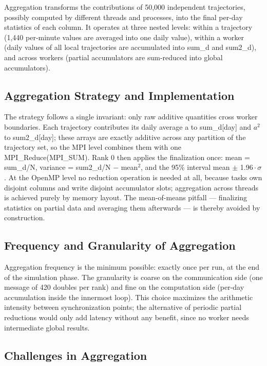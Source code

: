 \documentclass[12pt,a4paper]{article}
\begin{document}
Aggregation transforms the contributions of 50,000 independent
trajectories, possibly computed by different threads and processes, into
the final per-day statistics of each column. It operates at three nested
levels: within a trajectory (1,440 per-minute values are averaged into
one daily value), within a worker (daily values of all local
trajectories are accumulated into sum\_d and sum2\_d), and across
workers (partial accumulators are sum-reduced into global accumulators).

\subsection{Aggregation Strategy and Implementation}

The strategy follows a single invariant: only raw additive quantities
cross worker boundaries. Each trajectory contributes its daily average a
to sum\_d[day] and $a^2$ to sum2\_d[day]; these arrays are exactly
additive across any partition of the trajectory set, so the MPI level
combines them with one MPI\_Reduce(MPI\_SUM). Rank 0 then applies the
finalization once: mean = sum\_d/N, variance = sum2\_d/N $-$ mean$^2$, and the
95\% interval mean $\pm$ 1.96\,$\cdot$\,$\sigma$. At the OpenMP level no reduction operation
is needed at all, because tasks own disjoint columns and write disjoint
accumulator slots; aggregation across threads is achieved purely by
memory layout. The mean-of-means pitfall --- finalizing statistics on
partial data and averaging them afterwards --- is thereby avoided by
construction.

\subsection{Frequency and Granularity of Aggregation}

Aggregation frequency is the minimum possible: exactly once per run, at
the end of the simulation phase. The granularity is coarse on the
communication side (one message of 420 doubles per rank) and fine on the
computation side (per-day accumulation inside the innermost loop). This
choice maximizes the arithmetic intensity between synchronization
points; the alternative of periodic partial reductions would only add
latency without any benefit, since no worker needs intermediate global
results.

\subsection{Challenges in Aggregation}
\end{document}
